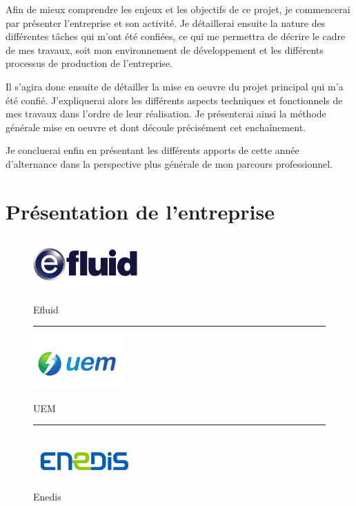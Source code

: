 \documentclass[a4paper, 12pt]{report}
\begin{document}
Afin de mieux comprendre les enjeux et les objectifs de ce projet, je commencerai par présenter l'entreprise et son activité. Je détaillerai ensuite la nature des différentes tâches qui m'ont été confiées, ce qui me permettra de décrire le cadre de mes travaux, soit mon environnement de développement et les différents processus de production de l'entreprise. 

Il s'agira donc ensuite de détailler la mise en oeuvre du projet principal qui m'a été confié. J'expliquerai alors les différents aspects techniques et fonctionnels de mes travaux dans l'ordre de leur réalisation. Je présenterai ainsi la méthode générale mise en oeuvre et dont découle précisément cet enchaînement. 

Je concluerai enfin en présentant les différents apports de cette année d'alternance dans la perspective plus générale de mon parcours professionnel.

\chapter{Présentation de l'entreprise}

\begin{figure}[t]
  \begin{center}
    \begin{minipage}{4cm}
      \begin{center}
        \includegraphics[height=2cm]{../res/logo-efluid.jpg}
        \caption{Efluid}
        \label{efluid}
      \end{center}
    \end{minipage}
    \rule{1cm}{0cm}
    \begin{minipage}{4cm}
      \begin{center}
        \includegraphics[height=2cm]{../res/logo-uem.jpg}
        \caption{UEM}
        \label{uem}
      \end{center}
    \end{minipage}
    \rule{1cm}{0cm}
    \begin{minipage}{4cm}
      \begin{center}
        \includegraphics[height=2cm]{../res/logo-enedis.jpg}
        \caption{Enedis}
        \label{enedis}
      \end{center}
    \end{minipage}
  \end{center}
\end{figure}
\end{document}
